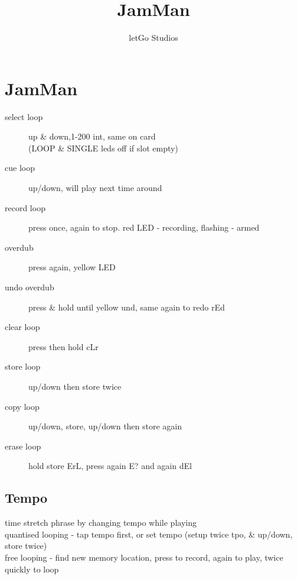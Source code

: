 \documentclass{tufte-handout}
\title{JamMan}
\author[letGo Studios]{letGo Studios}
\begin{document}




\section{JamMan}

\begin{description}
\item[select loop] up \& down,1-200 int, same on card \\
(LOOP \& SINGLE leds off if slot empty)
\item[cue loop] up/down, will play next time around
\item[record loop] press once, again to stop. red LED - recording, flashing - armed
\item[overdub] press again, yellow LED
\item[undo overdub] press \& hold until yellow {\selectfont und}, same again to redo {\selectfont rEd}
\item[clear loop] press then hold {\selectfont cLr}
\item[store loop] up/down then store twice
\item[copy loop] up/down, store, up/down then store again
\item[erase loop] hold store {\selectfont ErL}, press again {\selectfont E?} and again {\selectfont dEl}
\end{description}

\subsection{Tempo}

time stretch phrase by changing tempo while playing \\
quantised looping - tap tempo first, or set tempo (setup twice {\selectfont tpo}, \& up/down, store twice)\\
free looping - find new memory location, press to record, again to play, twice quickly to loop\\
\end{document}
